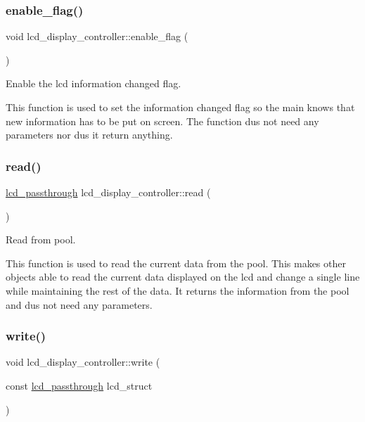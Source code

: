 \subsubsection{\texorpdfstring{enable\+\_\+flag()}{enable\_flag()}}
{\footnotesize\ttfamily void lcd\+\_\+display\+\_\+controller\+::enable\+\_\+flag (\begin{DoxyParamCaption}{ }\end{DoxyParamCaption})\hspace{0.3cm}{\ttfamily [inline]}}



Enable the lcd information changed flag. 

This function is used to set the information changed flag so the main knows that new information has to be put on screen. The function dus not need any parameters nor dus it return anything. \hypertarget{classlcd__display__controller_a9eb5a62f4b813f0ea44b3c7efaa6ec0a}{}\label{classlcd__display__controller_a9eb5a62f4b813f0ea44b3c7efaa6ec0a} 
\subsubsection{\texorpdfstring{read()}{read()}}
{\footnotesize\ttfamily \hyperlink{structlcd__passthrough}{lcd\+\_\+passthrough} lcd\+\_\+display\+\_\+controller\+::read (\begin{DoxyParamCaption}{ }\end{DoxyParamCaption})\hspace{0.3cm}{\ttfamily [inline]}}



Read from pool. 

This function is used to read the current data from the pool. This makes other objects able to read the current data displayed on the lcd and change a single line while maintaining the rest of the data. It returns the information from the pool and dus not need any parameters. \hypertarget{classlcd__display__controller_a66aacdfab1cbf14bd9cfe844fbb34b8a}{}\label{classlcd__display__controller_a66aacdfab1cbf14bd9cfe844fbb34b8a} 
\subsubsection{\texorpdfstring{write()}{write()}}
{\footnotesize\ttfamily void lcd\+\_\+display\+\_\+controller\+::write (\begin{DoxyParamCaption}\item[{const \hyperlink{structlcd__passthrough}{lcd\+\_\+passthrough}}]{lcd\+\_\+struct }\end{DoxyParamCaption})\hspace{0.3cm}{\ttfamily [inline]}}



